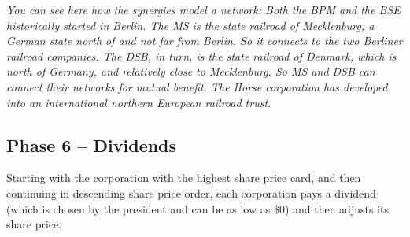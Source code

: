 \documentclass[10pt,final]{report}
\begin{document}
\begin{multicols}{2}
\emph{You can see here how the synergies model a network: Both the BPM
  and the BSE historically started in Berlin. The MS is the state
  railroad of Mecklenburg, a German state north of and not far from
  Berlin. So it connects to the two Berliner railroad companies. The
  DSB, in turn, is the state railroad of Denmark, which is north of
  Germany, and relatively close to Mecklenburg. So MS and DSB can
  connect their networks for mutual benefit. The Horse corporation has
  developed into an international northern European railroad trust.}
\columnbreak


\subsection{Phase 6 -- Dividends}
\label{t2p6}

Starting with the corporation with the highest share price card, and
then continuing in descending share price order, each corporation pays
a dividend (which is chosen by the president and can be as low as \$0)
and then adjusts its share price.


\end{multicols}
\end{document}
